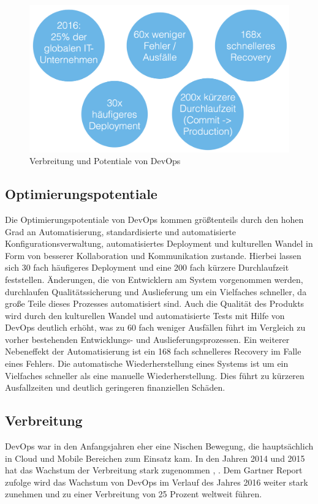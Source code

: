 \begin{figure}[ht]
  \centering
  \includegraphics[width=\textwidth]{img/devops_zahlen.png}
  \caption{Verbreitung und Potentiale von DevOps}
  \label{fig:scrummodell}
\end{figure}

\subsection{Optimierungspotentiale}
Die Optimierungspotentiale von DevOps kommen größtenteils durch den hohen Grad an Automatisierung, standardisierte und automatisierte Konfigurationsverwaltung, automatisiertes Deployment und kulturellen Wandel in Form von besserer Kollaboration und Kommunikation zustande. Hierbei lassen sich 30 fach häufigeres Deployment und eine 200 fach kürzere Durchlaufzeit feststellen. Änderungen, die von Entwicklern am System vorgenommen werden, durchlaufen Qualitätssicherung und Auslieferung um ein Vielfaches schneller, da große Teile dieses Prozesses automatisiert sind. Auch die Qualität des Produkts wird durch den kulturellen Wandel und automatisierte Tests mit Hilfe von DevOps deutlich erhöht, was zu 60 fach weniger Ausfällen führt im Vergleich zu vorher bestehenden Entwicklungs- und Auslieferungsprozessen. Ein weiterer Nebeneffekt der Automatisierung ist ein 168 fach schnelleres Recovery im Falle eines Fehlers. Die automatische Wiederherstellung eines Systems ist um ein Vielfaches schneller als eine manuelle Wiederherstellung. Dies führt zu kürzeren Ausfallzeiten und deutlich geringeren finanziellen Schäden. \parencite[][]{DevOpsSODR:2015}

\subsection{Verbreitung}
DevOps war in den Anfangsjahren eher eine Nischen Bewegung, die hauptsächlich in Cloud und Mobile Bereichen zum Einsatz kam. In den Jahren 2014 und 2015 hat das Wachstum der Verbreitung stark zugenommen \parencite[Vgl.][]{DevOpsSODR:2014}, \parencite[Vgl.][]{DevOpsSODR:2015}. Dem Gartner Report \parencite[Vgl.][]{Gartner:2015} zufolge wird das Wachstum von DevOps im Verlauf des Jahres 2016 weiter stark zunehmen und zu einer Verbreitung von 25 Prozent weltweit führen.

